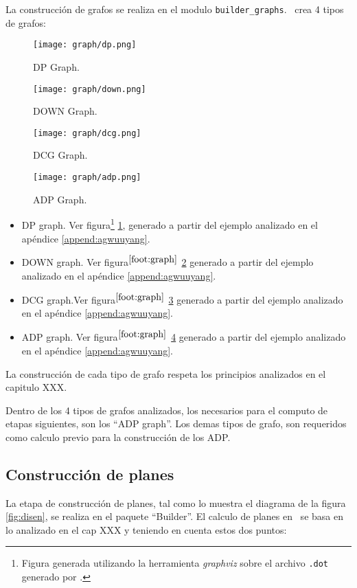 La construcción de grafos se realiza en el modulo \texttt{builder\_graphs}. \maggen\ crea 4 tipos de grafos:
\begin{figure}\centering
 \texttt{[image: graph/dp.png]}
\caption{\label{dpgraph} DP Graph.}
\end{figure}

\begin{figure}\centering
 \texttt{[image: graph/down.png]}
\caption{\label{downgraph} DOWN Graph.}
\end{figure}

\begin{figure}\centering
 \texttt{[image: graph/dcg.png]}
\caption{\label{dcggraph} DCG Graph.}
\end{figure}

\begin{figure}\centering
 \texttt{[image: graph/adp.png]}
\caption{\label{adpgraph} ADP Graph.}
\end{figure}


\begin{itemize}
\item DP graph. Ver figura\footnote {\label{foot:graph} Figura generada utilizando la herramienta \textit{graphviz} sobre el archivo \texttt{.dot} generado por \maggen.} \ref{dpgraph}, generado a partir del ejemplo analizado en el apéndice \ref{append:agwuuyang}.
\item DOWN graph. Ver figura$^{\ref{foot:graph}}$ \ref{downgraph} generado a partir del ejemplo analizado en el apéndice \ref{append:agwuuyang}.
\item DCG graph.Ver figura$^{\ref{foot:graph}}$ \ref{dcggraph} generado a partir del ejemplo analizado en el apéndice \ref{append:agwuuyang}.
\item ADP graph. Ver figura$^{\ref{foot:graph}}$  \ref{adpgraph} generado a partir del ejemplo analizado en el apéndice \ref{append:agwuuyang}.
\end{itemize}

La construcción de cada tipo de grafo respeta los principios analizados en el capitulo XXX. 

Dentro de los 4 tipos de grafos analizados, los necesarios para el computo de etapas siguientes, son los ``ADP graph''. Los demas tipos de grafo, son requeridos como calculo previo para la construcción de los ADP.


\subsection*{Construcción de planes}
La etapa de construcción de planes, tal como lo muestra el diagrama de la figura \ref{fig:disen}, se realiza en el paquete ``Builder''. El calculo de planes en \maggen\ se basa en lo analizado en el cap XXX y teniendo en cuenta estos dos puntos:

